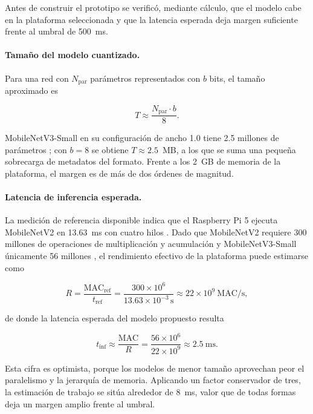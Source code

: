 Antes de construir el prototipo se verificó, mediante cálculo, que el modelo
cabe en la plataforma seleccionada y que la latencia esperada deja margen
suficiente frente al umbral de 500~ms.

\paragraph{Tamaño del modelo cuantizado.} Para una red con $N_{\text{par}}$
parámetros representados con $b$ bits, el tamaño aproximado es

\begin{equation}
T \approx \frac{N_{\text{par}} \cdot b}{8}.
\label{eq:tamano}
\end{equation}

MobileNetV3-Small en su configuración de ancho 1.0 tiene 2.5 millones de
parámetros \citep{howard2019}; con $b = 8$ se obtiene
$T \approx 2.5$~MB, a los que se suma una pequeña sobrecarga de metadatos del
formato. Frente a los 2~GB de memoria de la plataforma, el margen es de más
de dos órdenes de magnitud.

\paragraph{Latencia de inferencia esperada.} La medición de referencia
disponible indica que el Raspberry Pi 5 ejecuta MobileNetV2 en 13.63~ms con
cuatro hilos \citep{seeed2023bench}. Dado que MobileNetV2 requiere 300
millones de operaciones de multiplicación y acumulación y MobileNetV3-Small
únicamente 56 millones \citep{howard2019}, el rendimiento efectivo de la
plataforma puede estimarse como

\begin{equation}
R = \frac{\mathrm{MAC}_{\text{ref}}}{t_{\text{ref}}}
  = \frac{300 \times 10^{6}}{13.63 \times 10^{-3}\,\mathrm{s}}
  \approx 22 \times 10^{9}\ \mathrm{MAC/s},
\label{eq:rendimiento}
\end{equation}

\noindent de donde la latencia esperada del modelo propuesto resulta

\begin{equation}
t_{\text{inf}} \approx \frac{\mathrm{MAC}}{R}
  = \frac{56 \times 10^{6}}{22 \times 10^{9}}
  \approx 2.5\ \mathrm{ms}.
\label{eq:latencia}
\end{equation}

Esta cifra es optimista, porque los modelos de menor tamaño aprovechan peor
el paralelismo y la jerarquía de memoria. Aplicando un factor conservador de
tres, la estimación de trabajo se sitúa alrededor de 8~ms, valor que de todas
formas deja un margen amplio frente al umbral.

